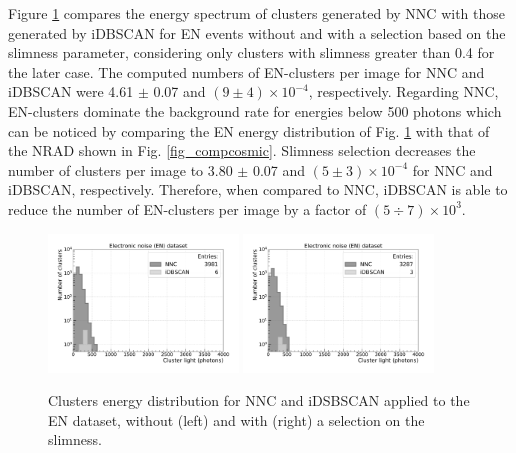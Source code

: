 \documentclass[a4paper,11pt]{article}
\begin{document}
Figure \ref{fig_compnoise} compares the energy spectrum of clusters generated by NNC with those generated by iDBSCAN for EN events without and with a selection based on the slimness parameter, considering only clusters with slimness greater than 0.4 for the later case. The computed numbers of EN-clusters per image for NNC and iDBSCAN were 4.61 $\pm$ 0.07 and $(9 \pm 4)\times 10^{-4}$, respectively.
Regarding NNC, EN-clusters dominate the background rate for energies below 500 photons which can be noticed by comparing the EN energy distribution of Fig. \ref{fig_compnoise} with that of the NRAD shown in Fig. \ref{fig_compcosmic}. Slimness selection decreases the number of clusters per image to 3.80 $\pm$ 0.07 and $(5 \pm 3)\times 10^{-4}$ for NNC and iDBSCAN, respectively. Therefore, when compared to NNC, iDBSCAN is able to reduce the number of EN-clusters per image by a  
factor of $(5\div7)\times 10^3$.

\begin{figure}[ht]
\centering
\includegraphics[width=0.45\textwidth]{LigthYield_No_wo.pdf}
\includegraphics[width=0.45\textwidth]{LigthYield_No_Slim.pdf}
\caption{Clusters energy distribution for NNC and iDSBSCAN applied to the EN dataset, without (left) and with (right) a selection on the slimness.}
\label{fig_compnoise}
\end{figure}
\end{document}

